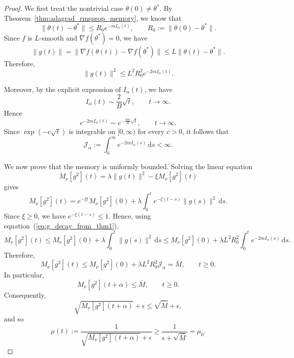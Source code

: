 \documentclass{article} %
\begin{document}
\begin{proof}
We first treat the nontrivial case \(\theta(0)\neq \theta^*\). By Theorem~\ref{thm:adagrad_rmsprop_memory}, we know that
\[
\|\theta(t)-\theta^*\|
\le
R_0 e^{-mI_\alpha(t)},
\qquad
R_0:=\|\theta(0)-\theta^*\|.
\]
Since \(f\) is \(L\)-smooth and \(\nabla f(\theta^*)=0\), we have
\[
\|g(t)\|
=
\|\nabla f(\theta(t))-\nabla f(\theta^*)\|
\le
L\|\theta(t)-\theta^*\|.
\]
Therefore,
\begin{equation}
\label{eq:g_decay_from_thm1}
\|g(t)\|^2
\le
L^2R_0^2 e^{-2mI_\alpha(t)}.
\end{equation}

Moreover, by the explicit expression of \(I_\alpha(t)\), we have
\[
I_\alpha(t)\sim \frac{2}{B}\sqrt t,
\qquad t\to\infty.
\]
Hence
\[
e^{-2mI_\alpha(t)}
\sim
e^{-\frac{4m}{B}\sqrt t},
\qquad t\to\infty.
\]
Since \(\exp(-c\sqrt t)\) is integrable on \([0,\infty)\) for every \(c>0\), it follows that
\[
\mathcal J_\alpha
:=
\int_0^\infty e^{-2mI_\alpha(s)}\,\mathrm ds
<
\infty.
\]

We now prove that the memory is uniformly bounded.  Solving the linear equation
\begin{equation}\label{eq:M_nu_differential}
\dot M_\nu[g^2](t)
=
\lambda\|g(t)\|^2-\xi M_\nu[g^2](t)
\end{equation}
gives
\[
M_\nu[g^2](t)
=
e^{-\xi t}M_\nu[g^2](0)
+
\lambda
\int_0^t
e^{-\xi(t-s)}\|g(s)\|^2\,\mathrm ds.
\]
Since \(\xi\ge 0\), we have \(e^{-\xi(t-s)}\le 1\). Hence, using equation~(\ref{eq:g_decay_from_thm1}),
\[
M_\nu[g^2](t)
\le
M_\nu[g^2](0)
+
\lambda
\int_0^t
\|g(s)\|^2\,\mathrm ds
\le
M_\nu[g^2](0)
+
\lambda L^2R_0^2
\int_0^t
e^{-2mI_\alpha(s)}\,\mathrm ds.
\]
Therefore,
\[
M_\nu[g^2](t)
\le
M_\nu[g^2](0)
+
\lambda L^2R_0^2\mathcal J_\alpha
=
\overline M,
\qquad
t\ge 0.
\]
In particular,
\[
M_\nu[g^2](t+\alpha)\le \overline M,
\qquad
t\ge 0.
\]
Consequently,
\[
\sqrt{M_\nu[g^2](t+\alpha)}+\epsilon
\le
\sqrt{\overline M}+\epsilon,
\]
and so
\begin{equation}
\label{eq:mu_lower_thm2}
\mu(t)
:=
\frac{1}{\sqrt{M_\nu[g^2](t+\alpha)}+\epsilon}
\ge
\frac{1}{\epsilon+\sqrt{\overline M}}
=
\mu_0.
\end{equation}


\end{proof}
\end{document}
